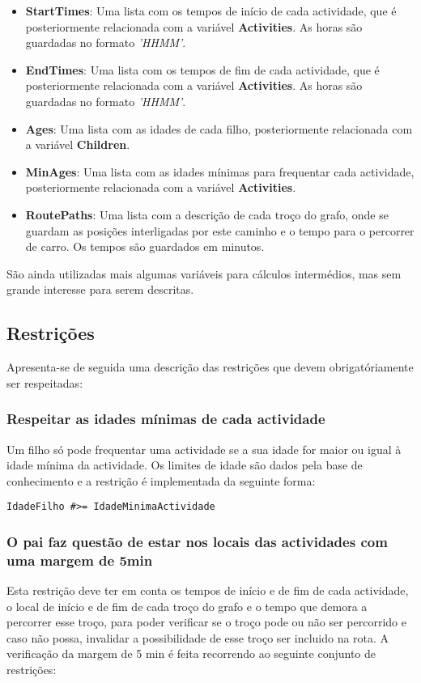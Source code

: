 \documentclass[runningheads]{llncs}
\begin{document}
\begin{itemize}
	\item \textbf{StartTimes}: Uma lista com os tempos de início de cada actividade, que é posteriormente relacionada com a variável \textbf{Activities}. As horas são guardadas no formato \textit{'HHMM'}.
	\item \textbf{EndTimes}: Uma lista com os tempos de fim de cada actividade, que é posteriormente relacionada com a variável \textbf{Activities}. As horas são guardadas no formato \textit{'HHMM'}.
	\item \textbf{Ages}: Uma lista com as idades de cada filho, posteriormente relacionada com a variável \textbf{Children}.
	\item \textbf{MinAges}: Uma lista com as idades mínimas para frequentar cada actividade, posteriormente relacionada com a variável \textbf{Activities}.	
	\item \textbf{RoutePaths}: Uma lista com a descrição de cada troço do grafo, onde se guardam as posições interligadas por este caminho e o tempo para o percorrer de carro. Os tempos são guardados em minutos.
\end{itemize}

São ainda utilizadas mais algumas variáveis para cálculos intermédios, mas sem grande interesse para serem descritas.

\subsection{Restrições}

Apresenta-se de seguida uma descrição das restrições que devem obrigatóriamente ser respeitadas:
\subsubsection{Respeitar as idades mínimas de cada actividade}
Um filho só pode frequentar uma actividade se a sua idade for maior ou igual à idade mínima da actividade. Os limites de idade são dados pela base de conhecimento e a restrição é implementada da seguinte forma:

\begin{lstlisting}
IdadeFilho #>= IdadeMinimaActividade
\end{lstlisting}

\subsubsection{O pai faz questão de estar nos locais das actividades com uma margem de 5min} Esta restrição deve ter em conta os tempos de início e de fim de cada actividade, o local de início e de fim de cada troço do grafo e o tempo que demora a percorrer esse troço, para poder verificar se o troço pode ou não ser percorrido e caso não possa, invalidar a possibilidade de esse troço ser incluido na rota. A verificação da margem de 5 min é feita recorrendo ao seguinte conjunto de restrições:
\end{document}
